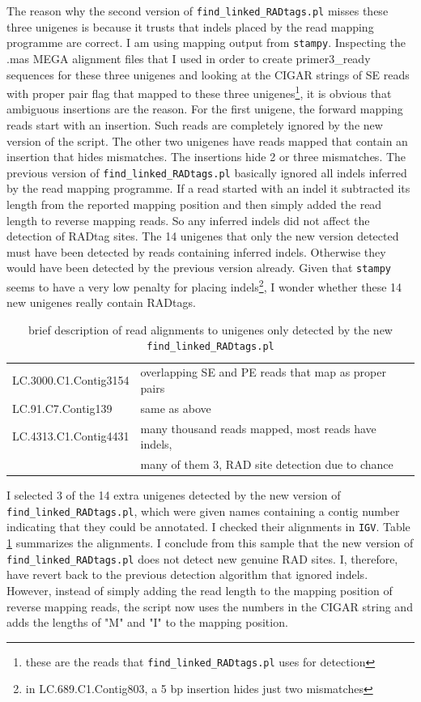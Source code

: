 \documentclass{article}\usepackage[]{graphicx}\usepackage[]{color}
\begin{document}
The reason why the second version of \texttt{find\_linked\_RADtags.pl} misses these three unigenes is because it trusts that indels placed by the read mapping programme are correct. I am using mapping output from \texttt{stampy}.  Inspecting the .mas MEGA alignment files that I used in order to create primer3\_ready sequences for these three unigenes and looking at the CIGAR strings of SE reads with proper pair flag that mapped to these three unigenes\footnote{these are the reads that \texttt{find\_linked\_RADtags.pl} uses for detection}, it is obvious that ambiguous insertions are the reason. For the first unigene, the forward mapping reads start with an insertion. Such reads are completely ignored by the new version of the script. The other two unigenes have reads mapped that contain an insertion that hides mismatches. The insertions hide 2 or three mismatches. The previous version of \texttt{find\_linked\_RADtags.pl} basically ignored all indels inferred by the read mapping programme. If a read started with an indel it subtracted its length from the reported mapping position and then simply added the read length to reverse mapping reads. So any inferred indels did not affect the detection of RADtag sites. The 14 unigenes that only the new version detected must have been detected by reads containing inferred indels. Otherwise they would have been detected by the previous version already. Given that \texttt{stampy} seems to have a very low penalty for placing indels\footnote{in LC.689.C1.Contig803, a 5 bp insertion hides just two mismatches}, I wonder whether these 14 new unigenes really contain RADtags.

\begin{table}[h]
\centering
\caption{brief description of read alignments to unigenes only detected by the new \texttt{find\_linked\_RADtags.pl}}
\label{extra-unigenes}
\begin{tabular}{ll}
\toprule
LC.3000.C1.Contig3154 & overlapping SE and PE reads that map as proper pairs \\
LC.91.C7.Contig139 &  same as above \\
LC.4313.C1.Contig4431 & many thousand reads mapped, most reads have indels, \\
& many of them 3, RAD site detection due to chance \\
\bottomrule
\end{tabular}
\end{table}

I selected 3 of the 14 extra unigenes detected by the new version of \texttt{find\_linked\_RADtags.pl}, which were given names containing a contig number indicating that they  could be annotated. I checked their alignments in \texttt{IGV}. Table \ref{extra-unigenes} summarizes the alignments. I conclude from this sample that the new version of \texttt{find\_linked\_RADtags.pl} does not detect new genuine RAD sites. I, therefore, have revert back to the previous detection algorithm that ignored indels. However, instead of simply adding the read length to the mapping position of reverse mapping reads, the script now uses the numbers in the CIGAR string and adds the lengths of "M" and "I" to the mapping position. 
\end{document}
